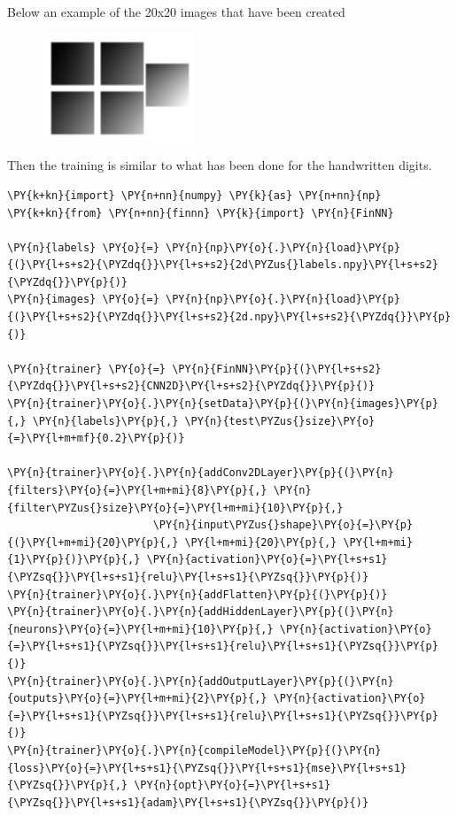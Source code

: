 Below an example of the 20x20 images that have been created
\begin{figure}[htb]
\centering
\includegraphics[width=0.4\textwidth]{figures/2d_training_images}
\end{figure}

Then the training is similar to what has been done for the handwritten
digits.

\begin{codebox}[breakable, size=fbox, boxrule=1pt, pad at break*=1mm,colback=cellbackground, colframe=cellborder]
\begin{Verbatim}[commandchars=\\\{\}]
\PY{k+kn}{import} \PY{n+nn}{numpy} \PY{k}{as} \PY{n+nn}{np}
\PY{k+kn}{from} \PY{n+nn}{finnn} \PY{k}{import} \PY{n}{FinNN}
	
\PY{n}{labels} \PY{o}{=} \PY{n}{np}\PY{o}{.}\PY{n}{load}\PY{p}{(}\PY{l+s+s2}{\PYZdq{}}\PY{l+s+s2}{2d\PYZus{}labels.npy}\PY{l+s+s2}{\PYZdq{}}\PY{p}{)}
\PY{n}{images} \PY{o}{=} \PY{n}{np}\PY{o}{.}\PY{n}{load}\PY{p}{(}\PY{l+s+s2}{\PYZdq{}}\PY{l+s+s2}{2d.npy}\PY{l+s+s2}{\PYZdq{}}\PY{p}{)}
	
\PY{n}{trainer} \PY{o}{=} \PY{n}{FinNN}\PY{p}{(}\PY{l+s+s2}{\PYZdq{}}\PY{l+s+s2}{CNN2D}\PY{l+s+s2}{\PYZdq{}}\PY{p}{)}
\PY{n}{trainer}\PY{o}{.}\PY{n}{setData}\PY{p}{(}\PY{n}{images}\PY{p}{,} \PY{n}{labels}\PY{p}{,} \PY{n}{test\PYZus{}size}\PY{o}{=}\PY{l+m+mf}{0.2}\PY{p}{)}
	
\PY{n}{trainer}\PY{o}{.}\PY{n}{addConv2DLayer}\PY{p}{(}\PY{n}{filters}\PY{o}{=}\PY{l+m+mi}{8}\PY{p}{,} \PY{n}{filter\PYZus{}size}\PY{o}{=}\PY{l+m+mi}{10}\PY{p}{,} 
                       \PY{n}{input\PYZus{}shape}\PY{o}{=}\PY{p}{(}\PY{l+m+mi}{20}\PY{p}{,} \PY{l+m+mi}{20}\PY{p}{,} \PY{l+m+mi}{1}\PY{p}{)}\PY{p}{,} \PY{n}{activation}\PY{o}{=}\PY{l+s+s1}{\PYZsq{}}\PY{l+s+s1}{relu}\PY{l+s+s1}{\PYZsq{}}\PY{p}{)}
\PY{n}{trainer}\PY{o}{.}\PY{n}{addFlatten}\PY{p}{(}\PY{p}{)}
\PY{n}{trainer}\PY{o}{.}\PY{n}{addHiddenLayer}\PY{p}{(}\PY{n}{neurons}\PY{o}{=}\PY{l+m+mi}{10}\PY{p}{,} \PY{n}{activation}\PY{o}{=}\PY{l+s+s1}{\PYZsq{}}\PY{l+s+s1}{relu}\PY{l+s+s1}{\PYZsq{}}\PY{p}{)}
\PY{n}{trainer}\PY{o}{.}\PY{n}{addOutputLayer}\PY{p}{(}\PY{n}{outputs}\PY{o}{=}\PY{l+m+mi}{2}\PY{p}{,} \PY{n}{activation}\PY{o}{=}\PY{l+s+s1}{\PYZsq{}}\PY{l+s+s1}{relu}\PY{l+s+s1}{\PYZsq{}}\PY{p}{)}
\PY{n}{trainer}\PY{o}{.}\PY{n}{compileModel}\PY{p}{(}\PY{n}{loss}\PY{o}{=}\PY{l+s+s1}{\PYZsq{}}\PY{l+s+s1}{mse}\PY{l+s+s1}{\PYZsq{}}\PY{p}{,} \PY{n}{opt}\PY{o}{=}\PY{l+s+s1}{\PYZsq{}}\PY{l+s+s1}{adam}\PY{l+s+s1}{\PYZsq{}}\PY{p}{)}
	

\end{Verbatim}
\end{codebox}
